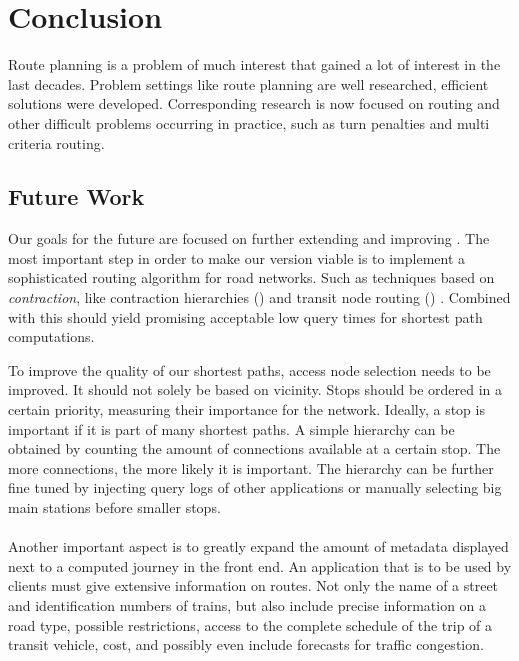 \chapter{Conclusion}\label{conclusion}
	Route planning is a problem of much interest that gained a lot of interest in the last decades. Problem settings like \uniModal route planning are
	well researched, efficient solutions were developed. Corresponding research is now focused on \multiModal routing and other difficult problems
	occurring in practice, such as turn penalties and multi criteria routing.

\section{Future Work}
	Our goals for the future are focused on further extending and improving \cobweb. The most important step in order to make our \anr version
	viable is to implement a sophisticated routing algorithm for road networks. Such as techniques based on \textit{contraction}, like contraction
	hierarchies (\ch)  and transit node routing (\tnr) . Combined with \csa this should yield promising
	acceptable low query times for shortest path computations.
	
	To improve the quality of our shortest paths, access node selection needs to be improved. It should not solely be based on vicinity.
	Stops should be ordered in a certain priority, measuring their importance for the network. Ideally, a stop is important if it is part
	of many shortest paths. A simple hierarchy can be obtained by counting the amount of connections available at a certain stop.
	The more connections, the more likely it is important.
	The hierarchy can be further fine tuned by injecting query logs of other applications or manually selecting big main
	stations before smaller stops.\\\\
	Another important aspect is to greatly expand the amount of metadata displayed next to a computed journey in the front end.
	An application that is to be used by clients must give extensive information on routes. Not only the name of a street and identification numbers of
	trains, but also include precise information on a road type, possible restrictions, access to the complete schedule of the trip of a transit vehicle,
	cost, and possibly even include forecasts for traffic congestion.
	
